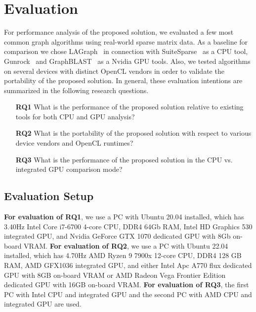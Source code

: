 \section{Evaluation}

For performance analysis of the proposed solution, we evaluated a few most common graph algorithms using real-world sparse matrix data. 
As a baseline for comparison we chose LAGraph~\cite{szarnyas2021lagraph} in connection with SuiteSparse~\cite{10.1145/3322125} as a CPU tool, Gunrock~\cite{7967137} and GraphBLAST~\cite{yang2019graphblast} as a Nvidia GPU tools. 
Also, we tested algorithms on several devices with distinct OpenCL vendors in order to validate the portability of the proposed solution. 
In general, these evaluation intentions are summarized in the following research questions. 

\vspace{0.2cm}
\begin{itemize}
    \item[\textbf{RQ1}] What is the performance of the proposed solution relative to existing tools for both CPU and GPU analysis?
    
    \item[\textbf{RQ2}] What is the portability of the proposed solution with respect to various device vendors and OpenCL runtimes?

    \item[\textbf{RQ3}] What is the performance of the proposed solution in the CPU vs. integrated GPU comparison mode?
\end{itemize}

\subsection{Evaluation Setup}

\textbf{For evaluation of RQ1}, we use a PC with Ubuntu 20.04 installed, which has 3.40Hz Intel Core i7-6700 4-core CPU, DDR4 64Gb RAM, Intel HD Graphics 530 integrated GPU, and Nvidia GeForce GTX 1070 dedicated GPU with 8Gb on-board VRAM. 
\textbf{For evaluation of RQ2}, we use a PC with Ubuntu 22.04 installed, which has 4.70Hz AMD Ryzen 9 7900x 12-core CPU, DDR4 128 GB RAM, AMD GFX1036 integrated GPU, and either Intel Apc A770 flux dedicated GPU with 8GB on-board VRAM or AMD Radeon Vega Frontier Edition dedicated GPU with 16GB on-board VRAM.
\textbf{For evaluation of RQ3}, the first PC with Intel CPU and integrated GPU and the second PC with AMD CPU and integrated GPU are used.

